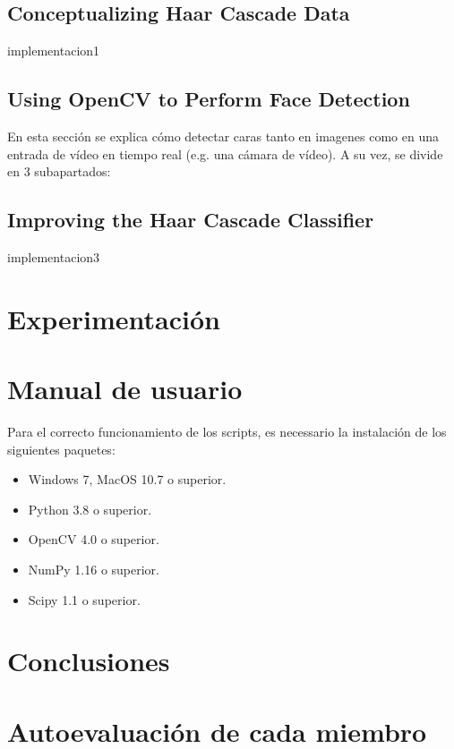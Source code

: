 \documentclass[a4paper]{article}
\begin{document}
\subsection{Conceptualizing Haar Cascade Data}

implementacion1

\subsection{Using OpenCV to Perform Face Detection}

En esta sección se explica cómo detectar caras tanto en imagenes como en una entrada de vídeo en tiempo real (e.g. una cámara de vídeo). A su vez, se divide en 3 subapartados:

\subsection{Improving the Haar Cascade Classifier}

implementacion3

\section{Experimentación}

\section{Manual de usuario}

Para el correcto funcionamiento de los scripts, es necessario la instalación de los siguientes paquetes:

\begin{itemize}
    \item Windows 7, MacOS 10.7 o superior.
    \item Python 3.8 o superior.
    \item OpenCV 4.0 o superior.
    \item NumPy 1.16 o superior.
    \item Scipy 1.1 o superior.
\end{itemize}

\section{Conclusiones}

\section{Autoevaluación de cada miembro}
\end{document}
